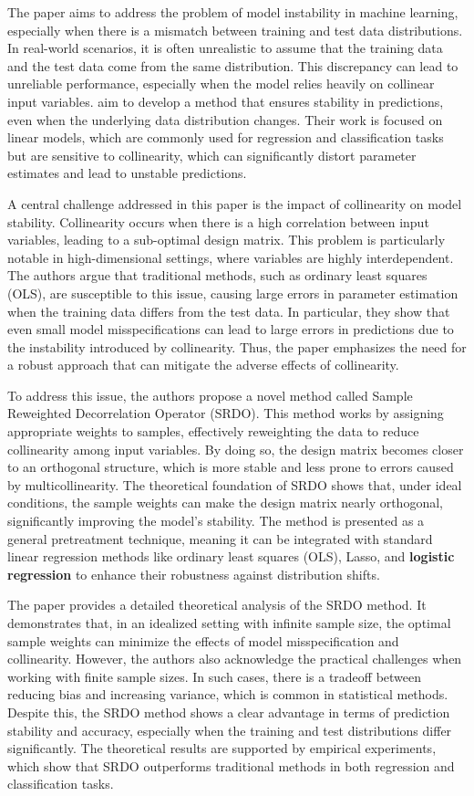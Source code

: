 \documentclass{article}
\theoremstyle{plain}
\theoremstyle{definition}
\theoremstyle{remark}
\begin{document}
The paper aims to address the problem of model instability in machine learning, especially when there is a mismatch between training and test data distributions. In real-world scenarios, it is often unrealistic to assume that the training data and the test data come from the same distribution. This discrepancy can lead to unreliable performance, especially when the model relies heavily on collinear input variables. \citeauthor{shen20} aim to develop a method that ensures stability in predictions, even when the underlying data distribution changes. Their work is focused on linear models, which are commonly used for regression and classification tasks but are sensitive to collinearity, which can significantly distort parameter estimates and lead to unstable predictions.

A central challenge addressed in this paper is the impact of collinearity on model stability. Collinearity occurs when there is a high correlation between input variables, leading to a sub-optimal design matrix. This problem is particularly notable in high-dimensional settings, where variables are highly interdependent. The authors argue that traditional methods, such as ordinary least squares (OLS), are susceptible to this issue, causing large errors in parameter estimation when the training data differs from the test data. In particular, they show that even small model misspecifications can lead to large errors in predictions due to the instability introduced by collinearity. Thus, the paper emphasizes the need for a robust approach that can mitigate the adverse effects of collinearity.

To address this issue, the authors propose a novel method called Sample Reweighted Decorrelation Operator (SRDO). This method works by assigning appropriate weights to samples, effectively reweighting the data to reduce collinearity among input variables. By doing so, the design matrix becomes closer to an orthogonal structure, which is more stable and less prone to errors caused by multicollinearity. The theoretical foundation of SRDO shows that, under ideal conditions, the sample weights can make the design matrix nearly orthogonal, significantly improving the model's stability. The method is presented as a general pretreatment technique, meaning it can be integrated with standard linear regression methods like ordinary least squares (OLS), Lasso, and \textbf{logistic regression} to enhance their robustness against distribution shifts.

The paper provides a detailed theoretical analysis of the SRDO method. It demonstrates that, in an idealized setting with infinite sample size, the optimal sample weights can minimize the effects of model misspecification and collinearity. However, the authors also acknowledge the practical challenges when working with finite sample sizes. In such cases, there is a tradeoff between reducing bias and increasing variance, which is common in statistical methods. Despite this, the SRDO method shows a clear advantage in terms of prediction stability and accuracy, especially when the training and test distributions differ significantly. The theoretical results are supported by empirical experiments, which show that SRDO outperforms traditional methods in both regression and classification tasks.
\end{document}
